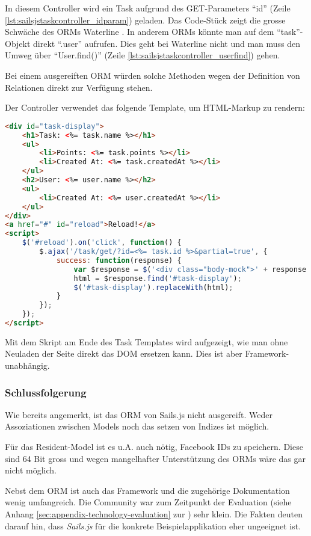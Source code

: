 In diesem Controller wird ein Task aufgrund des GET-Parameters ``id'' (Zeile \ref{lst:sailsjstaskcontroller_idparam}) geladen. Das Code-Stück zeigt die grosse Schwäche des ORMs Waterline \cite{Waterline}. In anderem ORMs könnte man auf dem ``task''-Objekt direkt ``.user'' aufrufen. Dies geht bei Waterline nicht und man muss den Umweg über ``User.find()'' (Zeile \ref{lst:sailsjstaskcontroller_userfind}) gehen.

Bei einem ausgereiften ORM würden solche Methoden wegen der Definition von Relationen direkt zur Verfügung stehen.

Der Controller verwendet das folgende Template, um HTML-Markup zu rendern:

\begin{lstlisting}[language=HTML, caption=Task Template]
<div id="task-display">
	<h1>Task: <%= task.name %></h1>
	<ul>
		<li>Points: <%= task.points %></li>
		<li>Created At: <%= task.createdAt %></li>
	</ul>
	<h2>User: <%= user.name %></h2>
	<ul>
		<li>Created At: <%= user.createdAt %></li>
	</ul>
</div>
<a href="#" id="reload">Reload!</a>
<script>
	$('#reload').on('click', function() {
		$.ajax('/task/get/?id=<%= task.id %>&partial=true', {
			success: function(response) {
				var $response = $('<div class="body-mock">' + response + '</div>');
				html = $response.find('#task-display');
				$('#task-display').replaceWith(html);
			}
		});
	});
</script>
\end{lstlisting}

Mit dem Skript am Ende des Task Templates wird aufgezeigt, wie man ohne Neuladen der Seite direkt das DOM ersetzen kann. Dies ist aber Framework-unabhängig.

\subsubsection*{Schlussfolgerung}

Wie bereits angemerkt, ist das ORM von Sails.js nicht ausgereift. Weder Assoziationen zwischen Models \cite{SailsjsModelAssociations} noch das setzen von Indizes ist möglich.

Für das Resident-Model ist es u.A. auch nötig, Facebook IDs zu speichern. Diese sind 64 Bit gross und wegen mangelhafter Unterstützung des ORMs wäre das gar nicht möglich.

Nebst dem ORM ist auch das Framework und die zugehörige Dokumentation wenig umfangreich. Die Community war zum Zeitpunkt der Evaluation (siehe Anhang \ref{sec:appendix-technology-evaluation} zur ) sehr klein. Die Fakten deuten darauf hin, dass \emph{Sails.js} für die konkrete Beispielapplikation eher ungeeignet ist.
